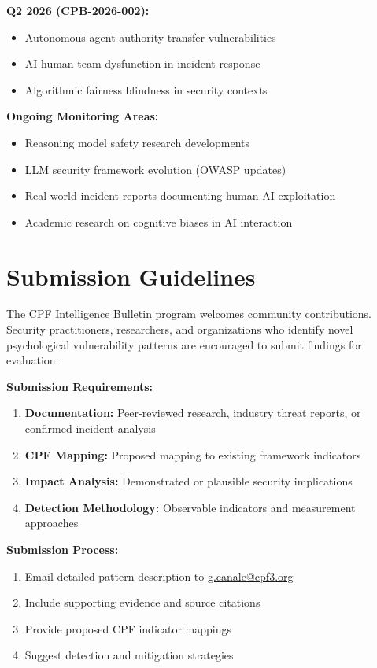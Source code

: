\documentclass[11pt,a4paper]{article}
\begin{document}
\textbf{Q2 2026 (CPB-2026-002):}
\begin{itemize}
\item Autonomous agent authority transfer vulnerabilities
\item AI-human team dysfunction in incident response
\item Algorithmic fairness blindness in security contexts
\end{itemize}

\textbf{Ongoing Monitoring Areas:}
\begin{itemize}
\item Reasoning model safety research developments
\item LLM security framework evolution (OWASP updates)
\item Real-world incident reports documenting human-AI exploitation
\item Academic research on cognitive biases in AI interaction
\end{itemize}

\section{Submission Guidelines}

The CPF Intelligence Bulletin program welcomes community contributions. Security practitioners, researchers, and organizations who identify novel psychological vulnerability patterns are encouraged to submit findings for evaluation.

\textbf{Submission Requirements:}
\begin{enumerate}
\item \textbf{Documentation:} Peer-reviewed research, industry threat reports, or confirmed incident analysis
\item \textbf{CPF Mapping:} Proposed mapping to existing framework indicators
\item \textbf{Impact Analysis:} Demonstrated or plausible security implications
\item \textbf{Detection Methodology:} Observable indicators and measurement approaches
\end{enumerate}

\textbf{Submission Process:}
\begin{enumerate}
\item Email detailed pattern description to \href{mailto:g.canale@cpf3.org}{g.canale@cpf3.org}
\item Include supporting evidence and source citations
\item Provide proposed CPF indicator mappings
\item Suggest detection and mitigation strategies
\end{enumerate}
\end{document}
